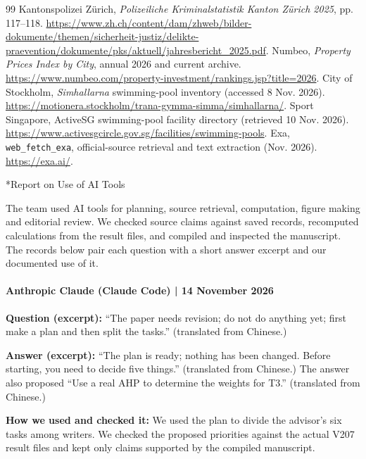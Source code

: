 \documentclass{mcmthesis}
\makeatletter
\newcommand\secstyle[1]{\vbox{\sffamily\Large\bfseries\color{Navy}#1\nointerlineskip\vskip.45ex{\color{Line}\hrule height .7pt}}}
\renewcommand\section{\@startsection{section}{1}{\z@}{-2.6ex \@plus -1ex \@minus -.2ex}{1.2ex \@plus .2ex}{\secstyle}}
\makeatother
\begin{document}
\begin{thebibliography}{99}
 Kantonspolizei Zürich, \textit{Polizeiliche Kriminalstatistik Kanton Zürich 2025}, pp. 117--118. \url{https://www.zh.ch/content/dam/zhweb/bilder-dokumente/themen/sicherheit-justiz/delikte-praevention/dokumente/pks/aktuell/jahresbericht_2025.pdf}.
 Numbeo, \textit{Property Prices Index by City}, annual 2026 and current archive. \url{https://www.numbeo.com/property-investment/rankings.jsp?title=2026}.
 City of Stockholm, \textit{Simhallarna} swimming-pool inventory (accessed 8 Nov. 2026). \url{https://motionera.stockholm/trana-gymma-simma/simhallarna/}.
 Sport Singapore, ActiveSG swimming-pool facility directory (retrieved 10 Nov. 2026). \url{https://www.activesgcircle.gov.sg/facilities/swimming-pools}.
 Exa, \texttt{web\_fetch\_exa}, official-source retrieval and text extraction (Nov. 2026). \url{https://exa.ai/}.
\end{thebibliography}
\label{main-end}
\clearpage
\section*{Report on Use of AI Tools}
The team used AI tools for planning, source retrieval, computation, figure
making and editorial review. We checked source claims against saved records,
recomputed calculations from the result files, and compiled and inspected the
manuscript. The records below pair each question with a short answer excerpt and
our documented use of it.\cite{exa}

\paragraph{Anthropic Claude (Claude Code) | 14 November 2026}
\textbf{Question (excerpt):} ``The paper needs revision; do not do anything yet; first make a plan and then split the tasks.'' (translated from Chinese.)

\textbf{Answer (excerpt):} ``The plan is ready; nothing has been changed. Before starting, you need to decide five things.'' (translated from Chinese.) The answer also proposed ``Use a real AHP to determine the weights for T3.'' (translated from Chinese.)

\textbf{How we used and checked it:} We used the plan to divide the advisor's six tasks among writers. We checked the proposed priorities against the actual V207 result files and kept only claims supported by the compiled manuscript.
\end{document}
